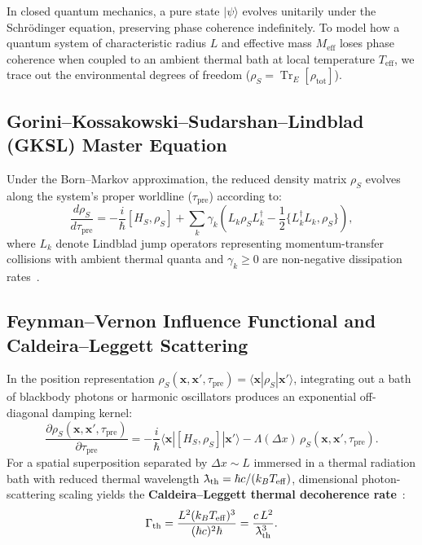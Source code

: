 \documentclass[11pt,a4paper]{article}
\newcommand{\lambdabar}{\mathchar'26\mkern-9mu\lambda}
\begin{document}
In closed quantum mechanics, a pure state $|\psi\rangle$ evolves unitarily under the Schr\"odinger equation, preserving phase coherence indefinitely. To model how a quantum system of characteristic radius $L$ and effective mass $M_{\mathrm{eff}}$ loses phase coherence when coupled to an ambient thermal bath at local temperature $T_{\mathrm{eff}}$, we trace out the environmental degrees of freedom ($\rho_S = \operatorname{Tr}_E[\rho_{\mathrm{tot}}]$).

\subsection{Gorini--Kossakowski--Sudarshan--Lindblad (GKSL) Master Equation}
Under the Born--Markov approximation, the reduced density matrix $\rho_S$ evolves along the system's proper worldline ($\tau_{\mathrm{pre}}$) according to:
\begin{equation}
\frac{d\rho_S}{d\tau_{\mathrm{pre}}} = -\frac{i}{\hbar}[H_S, \rho_S] + \sum_k \gamma_k \left( L_k \rho_S L_k^\dagger - \frac{1}{2}\{L_k^\dagger L_k, \rho_S\} \right),
\end{equation}
where $L_k$ denote Lindblad jump operators representing momentum-transfer collisions with ambient thermal quanta and $\gamma_k \ge 0$ are non-negative dissipation rates~\cite{Gorini1976,Lindblad1976}.

\subsection{Feynman--Vernon Influence Functional and Caldeira--Leggett Scattering}
In the position representation $\rho_S(\mathbf{x}, \mathbf{x}', \tau_{\mathrm{pre}}) = \langle \mathbf{x} | \rho_S | \mathbf{x}' \rangle$, integrating out a bath of blackbody photons or harmonic oscillators produces an exponential off-diagonal damping kernel:
\begin{equation}
\frac{\partial \rho_S(\mathbf{x}, \mathbf{x}', \tau_{\mathrm{pre}})}{\partial \tau_{\mathrm{pre}}} = -\frac{i}{\hbar}\langle \mathbf{x} | [H_S, \rho_S] | \mathbf{x}' \rangle - \Lambda(\Delta x)\,\rho_S(\mathbf{x}, \mathbf{x}', \tau_{\mathrm{pre}}).
\end{equation}
For a spatial superposition separated by $\Delta x \sim L$ immersed in a thermal radiation bath with reduced thermal wavelength $\lambdabar_{\mathrm{th}} = \hbar c / (k_B T_{\mathrm{eff}})$, dimensional photon-scattering scaling yields the \textbf{Caldeira--Leggett thermal decoherence rate}~\cite{Caldeira1983,Joos1985}:
\begin{equation}
\Gamma_{\mathrm{th}} = \frac{L^2 (k_B T_{\mathrm{eff}})^3}{(\hbar c)^2 \hbar} = \frac{c\, L^2}{\lambdabar_{\mathrm{th}}^3}.
\end{equation}
\end{document}
